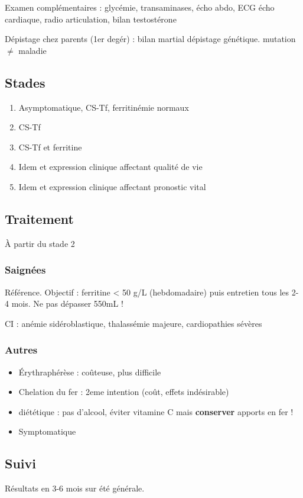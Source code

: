 \documentclass[11pt]{article}
\begin{document}
Examen complémentaires : glycémie, transaminases, écho abdo, ECG \textpm{} écho
cardiaque, radio articulation, bilan testostérone

Dépistage chez parents (1er degér) : bilan martial \textpm{} dépistage
génétique. \danger mutation \(\neq\) maladie

\subsection{Stades}
\label{sec:orgd07dea5}
\begin{enumerate}
\item Asymptomatique, CS-Tf, ferritinémie normaux
\item CS-Tf \inc
\item CS-Tf \inc et ferritine \inc
\item Idem et expression clinique affectant qualité de vie
\item Idem et expression clinique affectant pronostic vital
\end{enumerate}

\subsection{Traitement}
\label{sec:orgee2ffa7}
À partir du stade 2

\subsubsection{Saignées}
\label{sec:org33a833f}
Référence. Objectif : ferritine < 50 g/L (hebdomadaire) puis entretien tous les
  2-4 mois. Ne pas dépasser 550mL !

CI : anémie sidéroblastique, thalassémie majeure, cardiopathies sévères

\subsubsection{Autres}
\label{sec:org903668a}
\begin{itemize}
\item Érythraphérèse : coûteuse, plus difficile
\item Chelation du fer : 2eme intention (coût, effets indésirable)
\item diététique : pas d'alcool, éviter vitamine C mais \textbf{conserver} apports en fer !
\item Symptomatique
\end{itemize}

\subsection{Suivi}
\label{sec:org83e19bf}
Résultats en 3-6 mois sur été générale. 
\end{document}
